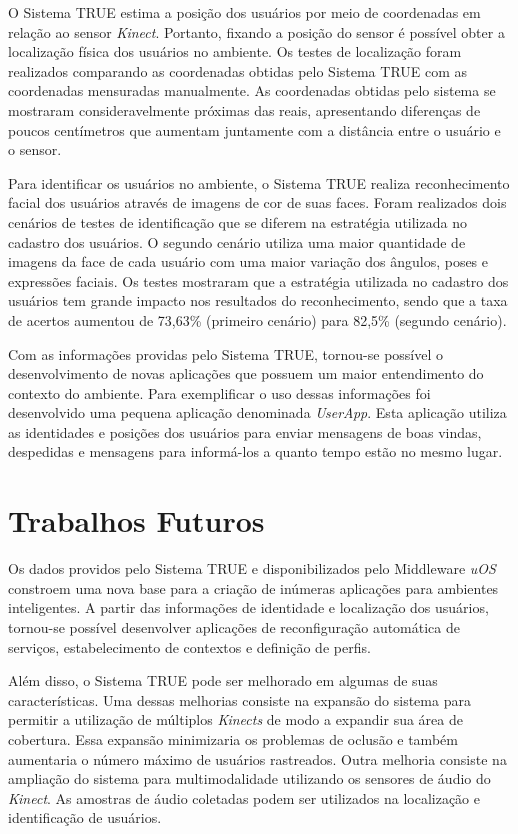 O Sistema TRUE estima a posição dos usuários por meio de coordenadas em relação ao sensor \textit{Kinect}. Portanto, fixando a posição do sensor é possível obter a localização física dos usuários no ambiente. Os testes de localização foram realizados comparando as coordenadas obtidas pelo Sistema TRUE com as coordenadas mensuradas manualmente. As coordenadas obtidas pelo sistema se mostraram consideravelmente próximas das reais, apresentando diferenças de poucos centímetros que aumentam juntamente com a distância entre o usuário e o sensor. 

Para identificar os usuários no ambiente, o Sistema TRUE realiza reconhecimento facial dos usuários através de imagens de cor de suas faces. Foram realizados dois cenários de testes de identificação que se diferem na estratégia utilizada no cadastro dos usuários. O segundo cenário utiliza uma maior quantidade de imagens da face de cada usuário com uma maior variação dos ângulos, poses e expressões faciais. Os testes mostraram que a estratégia utilizada no cadastro dos usuários tem grande impacto nos resultados do reconhecimento, sendo que a taxa de acertos aumentou de 73,63\% (primeiro cenário) para 82,5\% (segundo cenário).

Com as informações providas pelo Sistema TRUE, tornou-se possível o desenvolvimento de novas aplicações que possuem um maior entendimento do contexto do ambiente. Para exemplificar o uso dessas informações foi desenvolvido uma pequena aplicação denominada \textit{UserApp}. Esta aplicação utiliza as identidades e posições dos usuários para enviar mensagens de boas vindas, despedidas e mensagens para informá-los a quanto tempo estão no mesmo lugar.

\section{Trabalhos Futuros}

Os dados providos pelo Sistema TRUE e disponibilizados pelo Middleware \textit{uOS} constroem uma nova base para a criação de inúmeras aplicações para ambientes inteligentes. A partir das informações de identidade e localização dos usuários, tornou-se possível desenvolver aplicações de reconfiguração automática de serviços, estabelecimento de contextos e definição de perfis.

Além disso, o Sistema TRUE pode ser melhorado em algumas de suas características. Uma dessas melhorias consiste na expansão do sistema para permitir a utilização de múltiplos \textit{Kinects} de modo a expandir sua área de cobertura. Essa expansão minimizaria os problemas de oclusão e também aumentaria o número máximo de usuários rastreados. Outra melhoria consiste na ampliação do sistema para multimodalidade utilizando os sensores de áudio do \textit{Kinect}. As amostras de áudio coletadas podem ser utilizados na localização e identificação de usuários.

